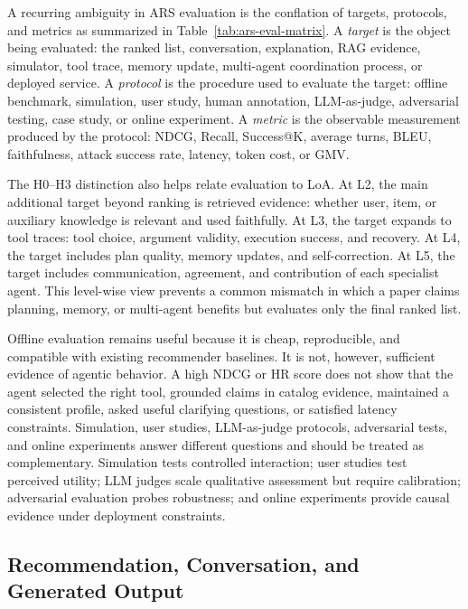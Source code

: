 A recurring ambiguity in ARS evaluation is the conflation of targets, protocols, and metrics as summarized in Table~\ref{tab:ars-eval-matrix}. A \emph{target} is the object being evaluated: the ranked list, conversation, explanation, RAG evidence, simulator, tool trace, memory update, multi-agent coordination process, or deployed service. A \emph{protocol} is the procedure used to evaluate the target: offline benchmark, simulation, user study, human annotation, LLM-as-judge, adversarial testing, case study, or online experiment. A \emph{metric} is the observable measurement produced by the protocol: NDCG, Recall, Success@K, average turns, BLEU, faithfulness, attack success rate, latency, token cost, or GMV. 


The H0--H3 distinction also helps relate evaluation to LoA. At L2, the main additional target beyond ranking is retrieved evidence: whether user, item, or auxiliary knowledge is relevant and used faithfully. At L3, the target expands to tool traces: tool choice, argument validity, execution success, and recovery. At L4, the target includes plan quality, memory updates, and self-correction. At L5, the target includes communication, agreement, and contribution of each specialist agent. This level-wise view prevents a common mismatch in which a paper claims planning, memory, or multi-agent benefits but evaluates only the final ranked list.

Offline evaluation remains useful because it is cheap, reproducible, and compatible with existing recommender baselines. It is not, however, sufficient evidence of agentic behavior. A high NDCG or HR score does not show that the agent selected the right tool, grounded claims in catalog evidence, maintained a consistent profile, asked useful clarifying questions, or satisfied latency constraints. Simulation, user studies, LLM-as-judge protocols, adversarial tests, and online experiments answer different questions and should be treated as complementary. Simulation tests controlled interaction; user studies test perceived utility; LLM judges scale qualitative assessment but require calibration; adversarial evaluation probes robustness; and online experiments provide causal evidence under deployment constraints.

\subsection{Recommendation, Conversation, and Generated Output}
\label{subsec:outcome-eval}

